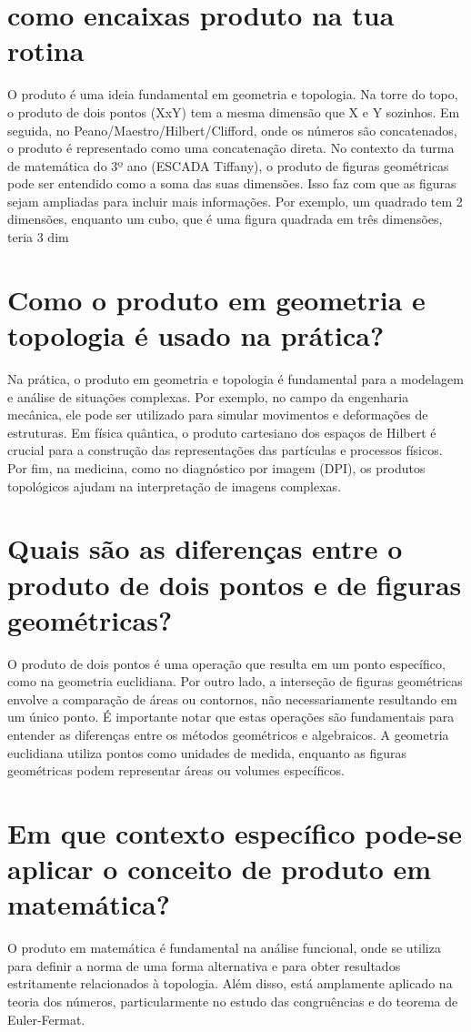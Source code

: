 \documentclass[11pt,a4paper]{article}
\begin{document}
\section{como encaixas produto na tua rotina}
O produto é uma ideia fundamental em geometria e topologia. Na torre do topo, o produto de dois pontos (XxY) tem a mesma dimensão que X e Y sozinhos. Em seguida, no Peano/Maestro/Hilbert/Clifford, onde os números são concatenados, o produto é representado como uma concatenação direta. No contexto da turma de matemática do 3º ano (ESCADA Tiffany), o produto de figuras geométricas pode ser entendido como a soma das suas dimensões. Isso faz com que as figuras sejam ampliadas para incluir mais informações. Por exemplo, um quadrado tem 2 dimensões, enquanto um cubo, que é uma figura quadrada em três dimensões, teria 3 dim

\section{Como o produto em geometria e topologia é usado na prática?}
Na prática, o produto em geometria e topologia é fundamental para a modelagem e análise de situações complexas. Por exemplo, no campo da engenharia mecânica, ele pode ser utilizado para simular movimentos e deformações de estruturas. Em física quântica, o produto cartesiano dos espaços de Hilbert é crucial para a construção das representações das partículas e processos físicos. Por fim, na medicina, como no diagnóstico por imagem (DPI), os produtos topológicos ajudam na interpretação de imagens complexas.

\section{Quais são as diferenças entre o produto de dois pontos e de figuras geométricas?}
O produto de dois pontos é uma operação que resulta em um ponto específico, como na geometria euclidiana. Por outro lado, a interseção de figuras geométricas envolve a comparação de áreas ou contornos, não necessariamente resultando em um único ponto. É importante notar que estas operações são fundamentais para entender as diferenças entre os métodos geométricos e algebraicos. A geometria euclidiana utiliza pontos como unidades de medida, enquanto as figuras geométricas podem representar áreas ou volumes específicos.

\section{Em que contexto específico pode-se aplicar o conceito de produto em matemática?}
O produto em matemática é fundamental na análise funcional, onde se utiliza para definir a norma de uma forma alternativa e para obter resultados estritamente relacionados à topologia. Além disso, está amplamente aplicado na teoria dos números, particularmente no estudo das congruências e do teorema de Euler-Fermat.
\end{document}

